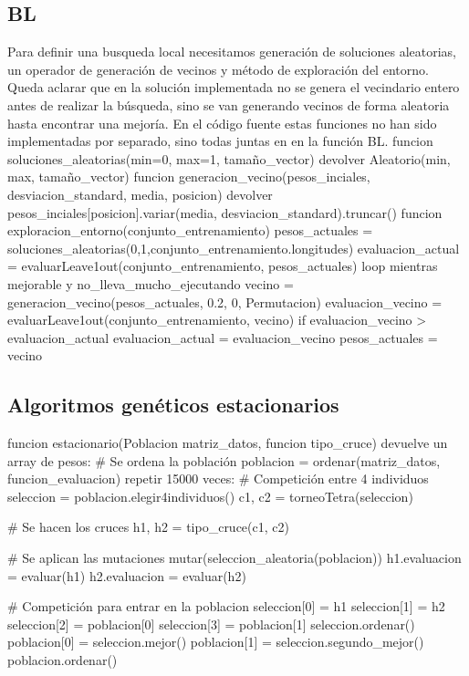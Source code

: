 \documentclass[12pt, spanish]{article}
\begin{document}
\pagebreak
\subsection{BL}
Para definir una busqueda local necesitamos generación de soluciones aleatorias, un operador de generación de vecinos y método de exploración del entorno. Queda aclarar que en la solución implementada no se genera el vecindario entero antes de realizar la búsqueda, sino se van generando vecinos de forma aleatoria hasta encontrar una mejoría. En el código fuente estas funciones no han sido implementadas por separado, sino todas juntas en en la función BL. 
funcion soluciones\_aleatorias(min=0, max=1, tamaño\_vector) { 
	devolver Aleatorio(min, max, tamaño\_vector) 
}
funcion generacion\_vecino(pesos\_inciales, desviacion\_standard, media, posicion) {
	devolver pesos\_inciales[posicion].variar(media, desviacion\_standard).truncar()
}
funcion exploracion\_entorno(conjunto\_entrenamiento) {
	pesos\_actuales = soluciones\_aleatorias(0,1,conjunto\_entrenamiento.longitudes)
	evaluacion\_actual = evaluarLeave1out(conjunto\_entrenamiento, pesos\_actuales)
	loop mientras mejorable y no\_lleva\_mucho\_ejecutando{
		vecino = generacion\_vecino(pesos\_actuales, 0.2, 0, Permutacion)
		evaluacion\_vecino = evaluarLeave1out(conjunto\_entrenamiento, vecino) 
		if evaluacion\_vecino > evaluacion\_actual {
			evaluacion\_actual = evaluacion\_vecino
			pesos\_actuales  = vecino 
		}
	}	 
} 
\subsection{Algoritmos genéticos estacionarios}
funcion estacionario(Poblacion matriz\_datos, funcion tipo\_cruce) devuelve un array de pesos:
    # Se ordena la población
    poblacion = ordenar(matriz\_datos, funcion\_evaluacion) 
	 repetir 15000 veces:
        # Competición entre 4 individuos
        seleccion = poblacion.elegir4individuos()
        c1, c2 = torneoTetra(seleccion)

        # Se hacen los cruces
        h1, h2 = tipo\_cruce(c1, c2)

        # Se aplican las mutaciones
        mutar(seleccion\_aleatoria(poblacion))
        h1.evaluacion = evaluar(h1)
        h2.evaluacion = evaluar(h2) 

        # Competición para entrar en la poblacion
        seleccion[0] = h1
        seleccion[1] = h2
        seleccion[2] = poblacion[0]
        seleccion[3] = poblacion[1]
        seleccion.ordenar()
        poblacion[0] = seleccion.mejor()
        poblacion[1] = seleccion.segundo\_mejor() 
        poblacion.ordenar() 
\end{document}
